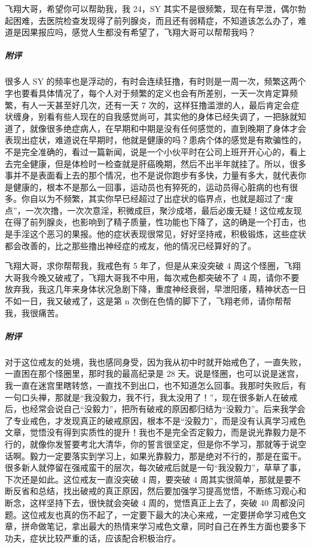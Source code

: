 \begin{case}
    飞翔大哥，希望你可以帮助我，我 24，SY 其实不是很频繁，现在有早泄，偶尔勃起困难，去医院检查发现得了前列腺炎，而且还有弱精症，不知道该怎么办了，难道是因果报应吗，感觉人生都没有希望了，飞翔大哥可以帮帮我吗？
    \subparagraph{附评} 很多人 SY 的频率也是浮动的，有时会连续狂撸，有时则是一周一次，频繁这两个字也要看具体情况了，每个人对于频繁的定义也会有所差别，一天一次肯定算频繁，有人一天甚至好几次，还有一天 7 次的，这样狂撸滥泄的人，最后肯定会症状缠身，别看有些人现在的自我感觉尚可，其实他的身体已经失调了，一把脉就知道了，就像很多绝症病人，在早期和中期是没有任何感觉的，直到晚期了身体才会表现出症状，难道说在早期时，他就是健康的吗？患病个体的感觉是有欺骗性的，不是完全准确的，看过一篇新闻，说是一个小伙平时在公司上班开开心心的，看上去完全健康，但是体检时一检查就是肝癌晚期，然后不出半年就挂了。所以，很多事并不是表面看上去的那个情况，也不是说你跑步有多快，力量有多大，就代表你是健康的，根本不是那么一回事，运动员也有猝死的，运动员得心脏病的也有很多。你自以为不频繁，其实你早已经超过了出症状的临界点，也就是超过了“废点”，一次次撸，一次次意淫，积微成巨，聚沙成塔，最后必废无疑！这位戒友现在得了前列腺炎，也影响到了精子质量，性功能也下降了，这的确是一个打击，也是手淫这个恶习的果报。他的症状表现很常见，好好坚持戒，积极锻炼，这些症状都会改善的，比之那些撸出神经症的戒友，他的情况已经算好的了。
\end{case}

\begin{case}
    飞翔大哥，求你帮帮我，我戒色有 5 年了，但是从来没突破 4 周这个怪圈，飞翔大哥我今晚又破戒了，飞翔大哥我不中用，每次戒色都突破不了 4 周，请你不要放弃我，我这几年来身体状况急剧下降，重度神经衰弱，早泄阳痿，精神状态一日不如一日，我又破戒了，这是第 n 次倒在色情的脚下了，飞翔老师，请你帮帮我，我很痛苦。
    \subparagraph{附评} 对于这位戒友的处境，我也感同身受，因为我从初中时就开始戒色了，一直失败，一直困在那个怪圈里，那时我的最高纪录是 28 天。说是怪圈，也可以说是迷宫，我一直在迷宫里瞎转悠，一直找不到出口，也不知道怎么回事。我那时失败后，有一句口头禅，那就是“我没毅力，我不行，我太没用了！”，现在很多新人在破戒后，也经常会说自己“没毅力”，把所有破戒的原因都归结为“没毅力”。后来我学会了专业戒色，才发现真正的破戒原因，根本不是“没毅力”，而是没有认真学习戒色文章，觉悟没有得到实质性的提升！我也不是完全否定毅力，而是说光靠毅力是不行的，就像你发誓要考北大清华，你的誓言很坚定，但是你不学习，那就等于说空话啊。毅力一定要落实到学习上，如果光靠毅力，那是绝对不行的，那是在蛮干。很多新人就停留在强戒蛮干的层次，每次破戒后就是一句“我没毅力”，草草了事，下次还是如此。这位戒友一直没突破 4 周，要突破 4 周其实很简单，那就是要不断反省和总结，找出破戒的真正原因，然后要加强学习提高觉悟，不断练习观心和断念，这样坚持下去，很快就会突破 4 周的，觉悟真正上去了，突破 40 周都没问题。这位戒友也真的伤不起了，一定要下最大的决心来戒，一定要拼命学习戒色文章，拼命做笔记，拿出最大的热情来学习戒色文章，同时自己在养生方面也要多下功夫，症状比较严重的话，应该配合积极治疗。
\end{case}


